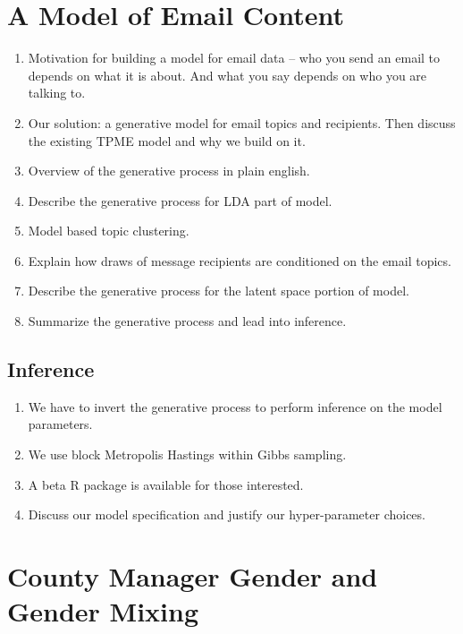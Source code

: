 \documentclass[fleqn]{MJDArticle}
\begin{document}
\section{A Model of Email Content}
\begin{enumerate}
	\item Motivation for building a model for email data -- who you send an email to depends on what it is about. And what you say depends on who you are talking to. 
	\item Our solution: a generative model for email topics and recipients. Then discuss the existing TPME model and why we build on it. 
	\item Overview of the generative process in plain english.
	\item Describe the generative process for LDA part of model.
	\item Model based topic clustering.
	\item Explain how draws of message recipients are conditioned on the email topics. 
	\item Describe the generative process for the latent space portion of model.
	\item Summarize the generative process and lead into inference. 
\end{enumerate}

\subsection{Inference}
\begin{enumerate}
	\item We have to invert the generative process to perform inference on the model parameters.
	\item We use block Metropolis Hastings within Gibbs sampling.
	\item A beta R package is available for those interested.
	\item Discuss our model specification and justify our hyper-parameter choices.
\end{enumerate}

\section{County Manager Gender and Gender Mixing}
\end{document}
